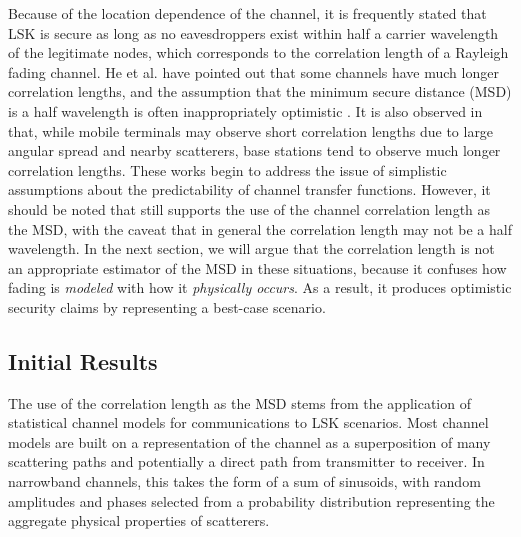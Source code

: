 \documentclass[12pt, titlepage]{article}
\begin{document}
Because of the location dependence of the channel, it is frequently stated that LSK is secure as long as no eavesdroppers exist within half a carrier wavelength of the legitimate nodes, which corresponds to the correlation length of a Rayleigh fading channel.  He et al. have pointed out that some channels have much longer correlation lengths, and the assumption that the minimum secure distance (MSD) is a half wavelength is often inappropriately optimistic \cite{he2013}.  
It is also observed in \cite{jakes1974} %
 that, while mobile terminals may observe short correlation lengths due to large angular spread and nearby scatterers, base stations tend to observe much longer correlation lengths.
These works begin to address the issue of simplistic assumptions about the predictability of channel transfer functions. 
However, it should be noted that \cite{he2013} still supports the use of the channel correlation length as the MSD, with the caveat that in general the correlation length may not be a half wavelength.  In the next section, we will argue that the correlation length is not an appropriate estimator of the MSD in these situations, because it confuses how fading is \emph{modeled} with how it \emph{physically occurs}.  As a result, it produces optimistic security claims by representing a best-case scenario.

\subsection*{Initial Results}
The use of the correlation length as the MSD stems from the application of statistical channel models for communications to LSK scenarios. Most channel models are built on a representation of the channel as a superposition of many scattering paths and potentially a direct path from transmitter to receiver. In narrowband channels, this takes the form of a sum of sinusoids, with random amplitudes and phases selected from a probability distribution representing the aggregate physical properties of scatterers. 
\end{document}
